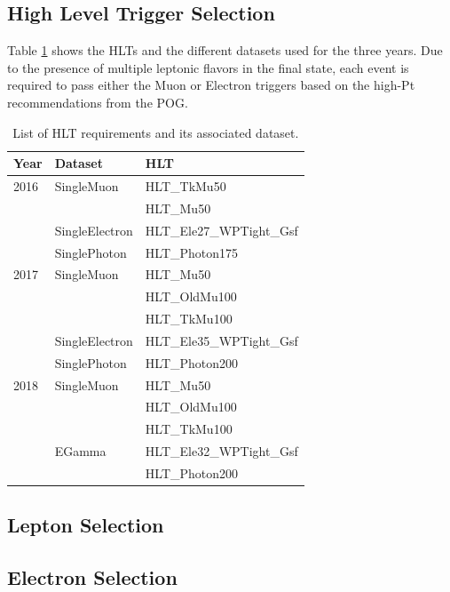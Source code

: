 \subsection{High Level Trigger Selection}

Table \ref{tab:HLTDatasets} shows the HLTs and the different datasets used for the three years.
Due to the presence of multiple leptonic flavors in the final state, each event
is required to pass either the Muon or Electron triggers based on the high-Pt
recommendations from the POG.

\begin{table}[h]
\centering
\caption{List of HLT requirements and its associated dataset.}
\begin{tabular}{|l|l|l|}
\hline
Year & Dataset & HLT                \\ \hline
2016 & SingleMuon     & HLT\_TkMu50 \\
     &                & HLT\_Mu50   \\
     & SingleElectron & HLT\_Ele27\_WPTight\_Gsf  \\
     & SinglePhoton   & HLT\_Photon175            \\ \hline
2017 & SingleMuon     & HLT\_Mu50       \\
     &                & HLT\_OldMu100   \\
     &                & HLT\_TkMu100    \\
     & SingleElectron & HLT\_Ele35\_WPTight\_Gsf  \\
     & SinglePhoton   & HLT\_Photon200            \\ \hline
2018 & SingleMuon & HLT\_Mu50     \\
     &            & HLT\_OldMu100 \\
     &            & HLT\_TkMu100  \\ \hline
     & EGamma     & HLT\_Ele32\_WPTight\_Gsf \\
     &            & HLT\_Photon200           \\ \hline
\end{tabular}
\label{tab:HLTDatasets}
\end{table}


\subsection{Lepton Selection}

\subsection{Electron Selection}

